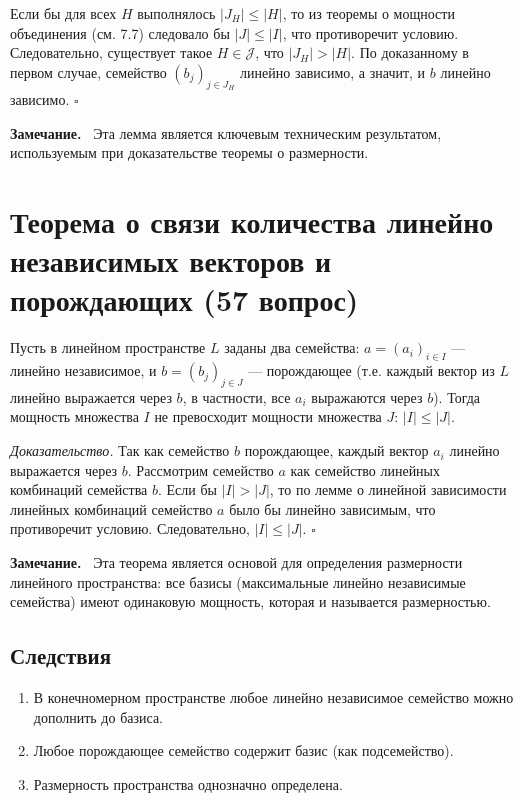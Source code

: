 \documentclass[a4paper,12pt]{article}
\newcommand{\myremark}{\textbf{Замечание.}\ }
\theoremstyle{definition}
\theoremstyle{plain}
\theoremstyle{remark}
\begin{document}
	Если бы для всех \( H \) выполнялось \( |J_H| \leq |H| \), то из теоремы о мощности объединения (см. 7.7) следовало бы \( |J| \leq |I| \), что противоречит условию. Следовательно, существует такое \( H \in \mathcal{J} \), что \( |J_H| > |H| \). По доказанному в первом случае, семейство \( (b_j)_{j \in J_H} \) линейно зависимо, а значит, и \( b \) линейно зависимо. \hfill \(\square\)
	
	\myremark
	Эта лемма является ключевым техническим результатом, используемым при доказательстве теоремы о размерности.
	
	
	\newpage	
	\section{Теорема о связи количества линейно независимых векторов и порождающих (57 вопрос)}
	
	\begin{tcolorbox}[colback=red!5, colframe=red!50!black, title=Теорема]
		Пусть в линейном пространстве \( L \) заданы два семейства: \( a = (a_i)_{i \in I} \) — линейно независимое, и \( b = (b_j)_{j \in J} \) — порождающее (т.е. каждый вектор из \( L \) линейно выражается через \( b \), в частности, все \( a_i \) выражаются через \( b \)). Тогда мощность множества \( I \) не превосходит мощности множества \( J \): \( |I| \leq |J| \).
	\end{tcolorbox}
	
	\medskip
	\textit{Доказательство.}
	Так как семейство \( b \) порождающее, каждый вектор \( a_i \) линейно выражается через \( b \). Рассмотрим семейство \( a \) как семейство линейных комбинаций семейства \( b \). Если бы \( |I| > |J| \), то по лемме о линейной зависимости линейных комбинаций семейство \( a \) было бы линейно зависимым, что противоречит условию. Следовательно, \( |I| \leq |J| \). \hfill \(\square\)
	
	\myremark
	Эта теорема является основой для определения размерности линейного пространства: все базисы (максимальные линейно независимые семейства) имеют одинаковую мощность, которая и называется размерностью.
	
	\subsection{Следствия}
	
	\begin{enumerate}
		\item В конечномерном пространстве любое линейно независимое семейство можно дополнить до базиса.
		\item Любое порождающее семейство содержит базис (как подсемейство).
		\item Размерность пространства однозначно определена.
	\end{enumerate}
	
\end{document}
